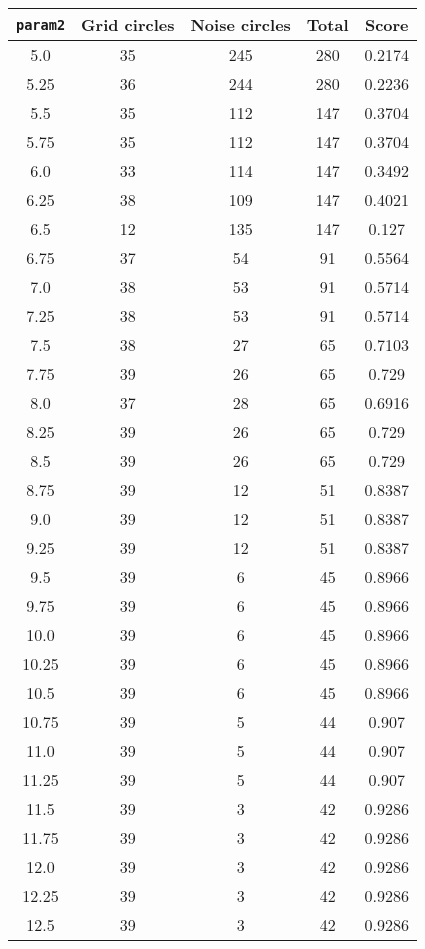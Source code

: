 \documentclass[letterpaper, 12pt]{article}
\begin{document}
\begin{longtable}{|c|c|c|c|c|}
\hline
\textbf{\texttt{param2}} & \textbf{Grid circles} & \textbf{Noise circles} & \textbf{Total} & \textbf{Score} \\
\hline
5.0 & 35 & 245 & 280 & 0.2174 \\
\hline
5.25 & 36 & 244 & 280 & 0.2236 \\
\hline
5.5 & 35 & 112 & 147 & 0.3704 \\
\hline
5.75 & 35 & 112 & 147 & 0.3704 \\
\hline
6.0 & 33 & 114 & 147 & 0.3492 \\
\hline
6.25 & 38 & 109 & 147 & 0.4021 \\
\hline
6.5 & 12 & 135 & 147 & 0.127 \\
\hline
6.75 & 37 & 54 & 91 & 0.5564 \\
\hline
7.0 & 38 & 53 & 91 & 0.5714 \\
\hline
7.25 & 38 & 53 & 91 & 0.5714 \\
\hline
7.5 & 38 & 27 & 65 & 0.7103 \\
\hline
7.75 & 39 & 26 & 65 & 0.729 \\
\hline
8.0 & 37 & 28 & 65 & 0.6916 \\
\hline
8.25 & 39 & 26 & 65 & 0.729 \\
\hline
8.5 & 39 & 26 & 65 & 0.729 \\
\hline
8.75 & 39 & 12 & 51 & 0.8387 \\
\hline
9.0 & 39 & 12 & 51 & 0.8387 \\
\hline
9.25 & 39 & 12 & 51 & 0.8387 \\
\hline
9.5 & 39 & 6 & 45 & 0.8966 \\
\hline
9.75 & 39 & 6 & 45 & 0.8966 \\
\hline
10.0 & 39 & 6 & 45 & 0.8966 \\
\hline
10.25 & 39 & 6 & 45 & 0.8966 \\
\hline
10.5 & 39 & 6 & 45 & 0.8966 \\
\hline
10.75 & 39 & 5 & 44 & 0.907 \\
\hline
11.0 & 39 & 5 & 44 & 0.907 \\
\hline
11.25 & 39 & 5 & 44 & 0.907 \\
\hline
11.5 & 39 & 3 & 42 & 0.9286 \\
\hline
11.75 & 39 & 3 & 42 & 0.9286 \\
\hline
12.0 & 39 & 3 & 42 & 0.9286 \\
\hline
12.25 & 39 & 3 & 42 & 0.9286 \\
\hline
12.5 & 39 & 3 & 42 & 0.9286 \\

\end{longtable}
\end{document}
